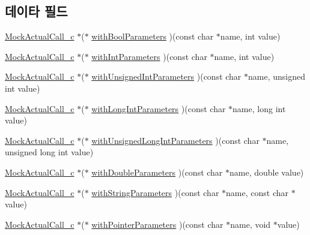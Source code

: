 \subsection*{데이타 필드}
\begin{DoxyCompactItemize}
\item 
\hyperlink{_mock_support__c_8h_a3b5a68f1396a1f65e85a5ff6b54e6bd7}{Mock\+Actual\+Call\+\_\+c} $\ast$($\ast$ \hyperlink{struct_s_mock_actual_call__c_ad9ff61be2bc554f296b3541da38e2a9b}{with\+Bool\+Parameters} )(const char $\ast$name, int value)
\item 
\hyperlink{_mock_support__c_8h_a3b5a68f1396a1f65e85a5ff6b54e6bd7}{Mock\+Actual\+Call\+\_\+c} $\ast$($\ast$ \hyperlink{struct_s_mock_actual_call__c_a43e787362c2505490ba112e29304daca}{with\+Int\+Parameters} )(const char $\ast$name, int value)
\item 
\hyperlink{_mock_support__c_8h_a3b5a68f1396a1f65e85a5ff6b54e6bd7}{Mock\+Actual\+Call\+\_\+c} $\ast$($\ast$ \hyperlink{struct_s_mock_actual_call__c_a825d367ebb53a347f646656176c52636}{with\+Unsigned\+Int\+Parameters} )(const char $\ast$name, unsigned int value)
\item 
\hyperlink{_mock_support__c_8h_a3b5a68f1396a1f65e85a5ff6b54e6bd7}{Mock\+Actual\+Call\+\_\+c} $\ast$($\ast$ \hyperlink{struct_s_mock_actual_call__c_a52a99bbfd66ff9dbfcd7331f2c9adec9}{with\+Long\+Int\+Parameters} )(const char $\ast$name, long int value)
\item 
\hyperlink{_mock_support__c_8h_a3b5a68f1396a1f65e85a5ff6b54e6bd7}{Mock\+Actual\+Call\+\_\+c} $\ast$($\ast$ \hyperlink{struct_s_mock_actual_call__c_a2afa0cf5bfbd2f388afe51f6fb3ff618}{with\+Unsigned\+Long\+Int\+Parameters} )(const char $\ast$name, unsigned long int value)
\item 
\hyperlink{_mock_support__c_8h_a3b5a68f1396a1f65e85a5ff6b54e6bd7}{Mock\+Actual\+Call\+\_\+c} $\ast$($\ast$ \hyperlink{struct_s_mock_actual_call__c_a3030940bf55fa1642d0d8cb48af1e94a}{with\+Double\+Parameters} )(const char $\ast$name, double value)
\item 
\hyperlink{_mock_support__c_8h_a3b5a68f1396a1f65e85a5ff6b54e6bd7}{Mock\+Actual\+Call\+\_\+c} $\ast$($\ast$ \hyperlink{struct_s_mock_actual_call__c_aa0a720408e4b251f4596735a09f15ae2}{with\+String\+Parameters} )(const char $\ast$name, const char $\ast$value)
\item 
\hyperlink{_mock_support__c_8h_a3b5a68f1396a1f65e85a5ff6b54e6bd7}{Mock\+Actual\+Call\+\_\+c} $\ast$($\ast$ \hyperlink{struct_s_mock_actual_call__c_a53a16e27e4df7be9ae48fb29e26e8ea5}{with\+Pointer\+Parameters} )(const char $\ast$name, void $\ast$value)

\end{DoxyCompactItemize}
